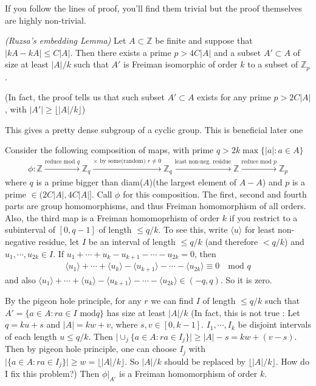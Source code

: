 \documentclass[12pt,a4paper]{report}
\newenvironment{proof}
{\begin{changemargin}{1cm}{0.5cm}
	}%
	{\end{changemargin}
}
\begin{document}
If you follow the lines of proof, you'll find them trivial but the proof themselves are highly non-trivial.
\s

 \emph{(Ruzsa's embedding Lemma)} Let $A\subset \mathbb{Z}$ be finite and suppose that $|kA-kA| \leq C|A|$. Then there exists a prime $p > 4C|A|$ and a subset $A'\subset A$ of size at least $|A|/k$ such that $A'$ is Freiman isomorphic of order $k$ to a subset of $\mathbb{Z}_p$.

(In fact, the proof tells us that such subset $A'\subset A$ exists for any prime $p>2C|A|$, with $|A'| \geq \lfloor |A|/k \rfloor$)
\s

This gives a pretty dense subgroup of a cyclic group. This is beneficial later one

\begin{proof}
\pf Consider the following composition of maps, with prime $q > 2k \max \{ |a|:a\in A\}$
\begin{align*}
\phi : \mathbb{Z} \xrightarrow{\text{reduce mod } q} \mathbb{Z}_q \xrightarrow{\times \text{ by some(random) }r\neq 0} \mathbb{Z}_q \xrightarrow{\text{least non-neg. residue}} \mathbb{Z} \xrightarrow{\text{reduce mod } p} \mathbb{Z}_p
\end{align*}
where $q$ is a prime bigger than diam($A$)(the largest element of $A-A$) and $p$ is a prime $\in (2C|A|,4C|A|]$. Call $\phi$ for this composition. The first, second and fourth parts are group homomorphisms, and thus Freiman homomorphism of all orders. Also, the third map is a Freiman homomoprhism of order $k$ if you restrict to a subinterval of $[0,q-1]$ of length $\leq q/k$. To see this, write $\langle u\rangle$ for least non-negative residue, let $I$ be an interval of length $\leq q/k$ (and therefore $<q/k$) and $u_1, \cdots, u_{2k} \in I$. If $u_1 + \cdots +u_k - u_{k+1} - \cdots -u_{2k} =0$, then
\begin{align*}
\langle u_1 \rangle + \cdots + \langle u_k \rangle - \langle u_{k+1} \rangle - \cdots - \langle u_{2k} \rangle \equiv 0 \quad \text{mod } q
\end{align*}
and also $\langle u_1 \rangle + \cdots + \langle u_k \rangle - \langle u_{k+1} \rangle - \cdots - \langle u_{2k} \rangle \in (-q,q)$. So it is zero.

\quad By the pigeon hole principle, for any $r$ we can find $I$ of length $\leq q/k$ such that $A' = \{ a\in A : ra\in I \text{ mod} q\}$ has size at least $|A|/k$ (In fact, this is not true : Let $q = ku + s$ and $|A| = kw + v$, where $s,v\in [0,k-1]$. $I_1,\cdots,I_k$ be disjoint intervals of each length $u \leq q/k$. Then $\big| \cup_j \{a\in A : ra \in I_j \} \big| \geq |A| -s = kw+(v-s)$. Then by pigeon hole principle, one can choose $I_j$ with $\Big| \{a\in A : ra \in I_j \} \Big| \geq w = \lfloor |A|/k \rfloor$. So $|A|/k$ should be replaced by $\lfloor |A|/k \rfloor$.  How do I fix this problem?) Then $\phi|_{A'}$ is a Freiman homomorphism of order $k$.
\s


\end{proof}
\end{document}

